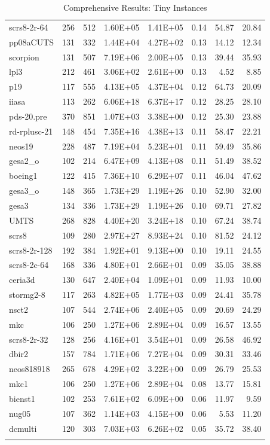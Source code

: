 \documentclass[10pt]{article}
\begin{document}
\begin{longtable}{|l|r|r|r|r|r|r|r|}
scrs8-2r-64	&	256	&	512	&	1.60E+05	&	1.41E+05	&	0.14	&	54.87	&	20.84	\\
pp08aCUTS	&	131	&	332	&	1.44E+04	&	4.27E+02	&	0.13	&	14.12	&	12.34	\\
scorpion	&	131	&	507	&	7.19E+06	&	2.00E+05	&	0.13	&	39.44	&	35.93	\\
lpl3	&	212	&	461	&	3.06E+02	&	2.61E+00	&	0.13	&	4.52	&	8.85	\\
p19	&	117	&	555	&	4.13E+05	&	4.37E+04	&	0.12	&	64.73	&	20.09	\\
iiasa	&	113	&	262	&	6.06E+18	&	6.37E+17	&	0.12	&	28.25	&	28.10	\\
pds-20.pre	&	370	&	851	&	1.07E+03	&	3.38E+00	&	0.12	&	25.30	&	23.88	\\
rd-rplusc-21	&	148	&	454	&	7.35E+16	&	4.38E+13	&	0.11	&	58.47	&	22.21	\\
neos19	&	228	&	487	&	7.19E+04	&	5.23E+01	&	0.11	&	59.49	&	35.86	\\
gesa2\_o	&	102	&	214	&	6.47E+09	&	4.13E+08	&	0.11	&	51.49	&	38.52	\\
boeing1	&	122	&	415	&	7.36E+10	&	6.29E+07	&	0.11	&	46.04	&	47.62	\\
gesa3\_o	&	148	&	365	&	1.73E+29	&	1.19E+26	&	0.10	&	52.90	&	32.00	\\
gesa3	&	134	&	336	&	1.73E+29	&	1.19E+26	&	0.10	&	69.71	&	27.82	\\
UMTS	&	268	&	828	&	4.40E+20	&	3.24E+18	&	0.10	&	67.24	&	38.74	\\
scrs8	&	109	&	280	&	2.97E+27	&	8.93E+24	&	0.10	&	81.52	&	24.12	\\
scrs8-2r-128	&	192	&	384	&	1.92E+01	&	9.13E+00	&	0.10	&	19.11	&	24.55	\\
scrs8-2c-64	&	168	&	336	&	4.80E+01	&	2.66E+01	&	0.09	&	35.05	&	38.88	\\
ceria3d	&	130	&	647	&	2.40E+04	&	1.09E+01	&	0.09	&	11.93	&	10.00	\\
stormg2-8	&	117	&	263	&	4.82E+05	&	1.77E+03	&	0.09	&	24.41	&	35.78	\\
nsct2	&	107	&	544	&	2.74E+06	&	2.40E+05	&	0.09	&	20.69	&	24.29	\\
mkc	&	106	&	250	&	1.27E+06	&	2.89E+04	&	0.09	&	16.57	&	13.55	\\
scrs8-2r-32	&	128	&	256	&	4.16E+01	&	3.54E+01	&	0.09	&	26.58	&	46.92	\\
dbir2	&	157	&	784	&	1.71E+06	&	7.27E+04	&	0.09	&	30.31	&	33.46	\\
neos818918	&	265	&	678	&	4.29E+02	&	3.22E+00	&	0.09	&	26.79	&	25.53	\\
mkc1	&	106	&	250	&	1.27E+06	&	2.89E+04	&	0.08	&	13.77	&	15.81	\\
bienst1	&	102	&	253	&	7.61E+02	&	6.09E+00	&	0.06	&	11.97	&	9.59	\\
nug05	&	107	&	362	&	1.14E+03	&	4.15E+00	&	0.06	&	5.53	&	11.20	\\
dcmulti	&	120	&	303	&	7.03E+03	&	6.26E+02	&	0.05	&	35.72	&	38.40	\\
\hline
\caption{Comprehensive Results: Tiny Instances}
\small
\centering
\label{supptab:all_tiny}
\end{longtable}
\end{document}
